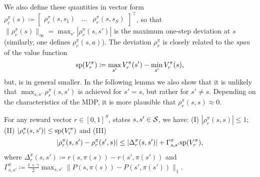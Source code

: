We also define these quantities in vector form
$
\rho_r^\pi(s) \coloneqq \begin{bmatrix}
    \rho_r^\pi(s,s_1) &\dots &\rho_r^\pi(s,s_S)
\end{bmatrix}^\top$,
so that $\|\rho_r^\pi(s)\|_\infty= \max_{s'} |\rho_r^\pi(s,s')|$ is the maximum
one-step deviation at $s$ (similarly, one defines $\rho_r^\pi(s,a)$).
The deviation $\rho_r^\pi$ is closely related to the \emph{span} of the value function \begin{equation}
    {\rm sp}(V_r^\pi) \coloneqq \max_{s'}V_r^\pi(s')-\min_{s'} V_r^\pi(s),
\end{equation}
but, is in general smaller. In the following lemma we also show that it is unlikely that $\max_{s,s'}\rho_r^\pi(s,s')$ is achieved for $s'=s$, but rather for $s'\neq s$. 
Depending on the characteristics of the MDP, it is more plausible that $\rho_r^\pi(s,s)\approx 0$. 
\begin{tcolorbox}
\begin{lemma}\label{lemma:bound_rho}
        For any reward vector $r \in [0,1]^S$, states $s,s'\in {\cal S}$, we have:
     (I) $|\rho_r^\pi(s,s)| \leq 1$; (II) 
     $|\rho_r^\pi(s,s')|\leq {\rm sp}(V_r^\pi)$ and (III) \[|\rho_r^\pi(s,s')-\rho_r^\pi(s',s)|\leq  |\Delta_r^\pi(s,s')|+ \Gamma_{s,s'}^\pi{\rm sp}(V_r^\pi),\] where $\Delta_r^\pi(s,s')\coloneqq r(s,\pi(s))-r(s',\pi(s'))$ and $\Gamma_{s,s'}^\pi \coloneqq \frac{1+\gamma}{2}\max_{s,s'}\|P(s,\pi(s))- P(s',\pi(s'))\|_1$.
\end{lemma}
\end{tcolorbox}
